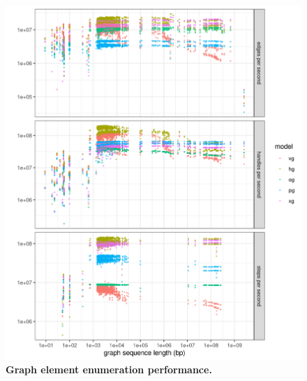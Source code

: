 \documentclass{article}
\begin{document}
\begin{figure}
  \centering
  \includegraphics[width=1.0\textwidth]{figures/iteration_per_second.png}
  \caption{
    \label{fig:prof2}
    \textbf{Graph element enumeration performance.} 
    }
\end{figure}
\end{document}
